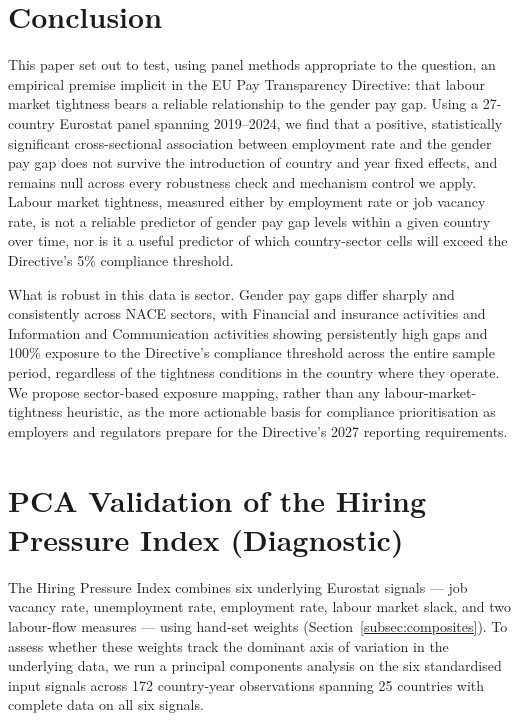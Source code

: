 \documentclass[12pt,a4paper]{article}
\begin{document}
\section{Conclusion}
\label{sec:conclusion}

This paper set out to test, using panel methods appropriate to the question, an
empirical premise implicit in the EU Pay Transparency Directive: that labour
market tightness bears a reliable relationship to the gender pay gap.  Using a
27-country Eurostat panel spanning 2019--2024, we find that a positive,
statistically significant cross-sectional association between employment rate and
the gender pay gap does not survive the introduction of country and year fixed
effects, and remains null across every robustness check and mechanism control we
apply.  Labour market tightness, measured either by employment rate or job
vacancy rate, is not a reliable predictor of gender pay gap levels within a given
country over time, nor is it a useful predictor of which country-sector cells
will exceed the Directive's 5\% compliance threshold.

What is robust in this data is sector.  Gender pay gaps differ sharply and
consistently across NACE sectors, with Financial and insurance activities and
Information and Communication activities showing persistently high gaps and 100\%
exposure to the Directive's compliance threshold across the entire sample period,
regardless of the tightness conditions in the country where they operate.  We
propose sector-based exposure mapping, rather than any labour-market-tightness
heuristic, as the more actionable basis for compliance prioritisation as employers
and regulators prepare for the Directive's 2027 reporting requirements.

\appendix
\section{PCA Validation of the Hiring Pressure Index (Diagnostic)}
\label{sec:appendix}

The Hiring Pressure Index combines six underlying Eurostat signals --- job
vacancy rate, unemployment rate, employment rate, labour market slack, and two
labour-flow measures --- using hand-set weights (Section~\ref{subsec:composites}).
To assess whether these weights track the dominant axis of variation in the
underlying data, we run a principal components analysis on the six standardised
input signals across 172 country-year observations spanning 25 countries with
complete data on all six signals.
\end{document}
